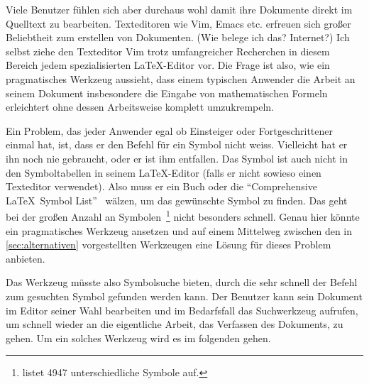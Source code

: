 Viele Benutzer fühlen sich aber durchaus wohl damit ihre Dokumente direkt im Quelltext zu bearbeiten. Texteditoren wie Vim, Emacs etc. erfreuen sich großer Beliebtheit zum erstellen von Dokumenten. (\TODO Wie belege ich das? Internet?) Ich selbst ziehe den Texteditor Vim trotz umfangreicher Recherchen in diesem Bereich jedem spezialisierten \LaTeX-Editor vor. Die Frage ist also, wie ein pragmatisches Werkzeug aussieht, dass einem typischen Anwender die Arbeit an seinem Dokument insbesondere die Eingabe von mathematischen Formeln erleichtert ohne dessen Arbeitsweise komplett umzukrempeln.

Ein Problem, das jeder Anwender egal ob Einsteiger oder Fortgeschrittener einmal hat, ist, dass er den Befehl für ein Symbol nicht weiss. Vielleicht hat er ihn noch nie gebraucht, oder er ist ihm entfallen. Das Symbol ist auch nicht in den Symboltabellen in seinem \LaTeX-Editor (falls er nicht sowieso einen Texteditor verwendet). Also muss er ein Buch oder die "`Comprehensive \LaTeX\ Symbol List"'~\cite{Pakin:2009p2664} wälzen, um das gewünschte Symbol zu finden. Das geht bei der großen Anzahl an Symbolen~\footnote{\cite{Pakin:2009p2664} listet 4947 unterschiedliche Symbole auf.} nicht besonders schnell. Genau hier könnte ein pragmatisches Werkzeug ansetzen und auf einem Mittelweg zwischen den in \ref{sec:alternativen} vorgestellten Werkzeugen eine Lösung für dieses Problem anbieten.

Das Werkzeug müsste also Symbolsuche bieten, durch die sehr schnell der Befehl zum gesuchten Symbol gefunden werden kann. Der Benutzer kann sein Dokument im Editor seiner Wahl bearbeiten und im Bedarfsfall das Suchwerkzeug aufrufen, um schnell wieder an die eigentliche Arbeit, das Verfassen des Dokuments, zu gehen. Um ein solches Werkzeug wird es im folgenden gehen.

